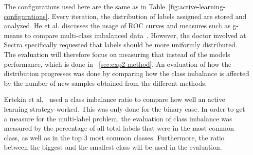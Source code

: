 The configurations used here are the same as in Table~\ref{fig:active-learning-configurations}.
Every iteration, the distribution of labels assigned are stored and analyzed.
He et al\@. discusses the usage of ROC curves and measures such as g-means to compare multi-class imbalanced data~\cite{he2009learning}.
However, the doctor involved at Sectra specifically requested that labels should be more uniformly distributed. 
The evaluation will therefore focus on measuring that instead of the models performance, which is done in ~\ref{sec:exp2-method}.
An evaluation of how the distribution progresses was done by comparing how the class imbalance is affected by the number of new samples obtained from the different methods.

Ertekin et al\@.~\cite{ertekin2007learning} used a class imbalance ratio to compare how well an active learning strategy worked.
This was only done for the binary case.
In order to get a measure for the multi-label problem, the evaluation of class imbalance was measured by the percentage of all total labels that were in the most common class, as well as in the top 3 most common classes.
Furthermore, the ratio between the biggest and the smallest class will be used in the evaluation.
